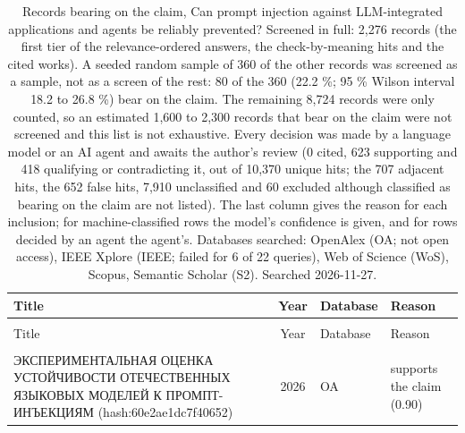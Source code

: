 \ifdefined\XeTeXversion\providecommand{\scholarnonlatinsep}{}\fi
\ifdefined\directlua\providecommand{\scholarnonlatinsep}{}\fi
\providecommand{\scholarnonlatinsep}{\ }
\ifdefined\XeTeXversion\providecommand{\scholarnonlatin}[1]{#1}\fi
\ifdefined\directlua\providecommand{\scholarnonlatin}[1]{#1}\fi
\providecommand{\scholarnonlatin}[1]{[non-Latin text]}
\begingroup\footnotesize
\begin{longtable}{@{}%
  >{\raggedright\arraybackslash}p{}c%
  >{\raggedright\arraybackslash}p{}%
  >{\raggedright\arraybackslash}p{}@{}}
\caption{Records bearing on the claim, Can prompt injection against LLM-integrated applications and agents be reliably prevented? Screened in full: 2,276 records (the first tier of the relevance-ordered answers, the check-by-meaning hits and the cited works). A seeded random sample of 360 of the other records was screened as a sample, not as a screen of the rest: 80 of the 360 (22.2 \%; 95 \% Wilson interval 18.2 to 26.8 \%) bear on the claim. The remaining 8,724 records were only counted, so an estimated 1,600 to 2,300 records that bear on the claim were not screened and this list is not exhaustive. Every decision was made by a language model or an AI agent and awaits the author's review (0 cited, 623 supporting and 418 qualifying or contradicting it, out of 10,370 unique hits; the 707 adjacent hits, the 652 false hits, 7,910 unclassified and 60 excluded although classified as bearing on the claim are not listed). The last column gives the reason for each inclusion; for machine-classified rows the model's confidence is given, and for rows decided by an agent the agent's. Databases searched: OpenAlex (OA; not open access), IEEE Xplore (IEEE; failed for 6 of 22 queries), Web of Science (WoS), Scopus, Semantic Scholar (S2). Searched 2026-11-27.}\label{tab:prompt-injection:hits-table}\\
\toprule
Title & Year & Database & Reason \\
\midrule
\endfirsthead
\multicolumn{4}{@{}l}{\emph{\tablename~\thetable{} (cont.)}}\\
\toprule
Title & Year & Database & Reason \\
\midrule
\endhead
\midrule \multicolumn{4}{r@{}}{\emph{continued on next page}}\\
\endfoot
\bottomrule
\endlastfoot
\scholarnonlatin{ЭКСПЕРИМЕНТАЛЬНАЯ ОЦЕНКА УСТОЙЧИВОСТИ ОТЕЧЕСТВЕННЫХ ЯЗЫКОВЫХ МОДЕЛЕЙ К ПРОМПТ-ИНЪЕКЦИЯМ} (hash:60e2ae1dc7f40652) & 2026 & OA & supports the claim (0.90) \\

\end{longtable}
